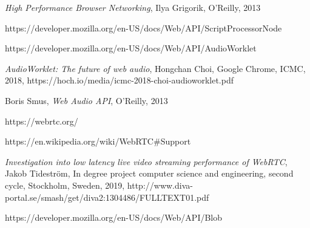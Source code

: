 \documentclass[11pt, a4paper, twoside]{article}
\begin{document}
\begin{thebibliography}{9}

  \textit{High Performance Browser Networking},
  Ilya Grigorik,
  O'Reilly,
  2013
  
  https://developer.mozilla.org/en-US/docs/Web/API/ScriptProcessorNode

  https://developer.mozilla.org/en-US/docs/Web/API/AudioWorklet

  \textit{AudioWorklet: The future of web audio},
  Hongchan Choi,
  Google Chrome,
  ICMC,
  2018,
  https://hoch.io/media/icmc-2018-choi-audioworklet.pdf

  Boris Smus,
  \textit{Web Audio API},
  O'Reilly,
  2013

  https://webrtc.org/
  
  https://en.wikipedia.org/wiki/WebRTC\#Support
  
\bibitem{}
  \textit{Investigation into low latency live video streaming performance of WebRTC},\newline
  Jakob Tidestr\"om,
  In degree project computer science and engineering, second cycle, \newline
  Stockholm,
  Sweden,
  2019,\newline
  http://www.diva-portal.se/smash/get/diva2:1304486/FULLTEXT01.pdf


  https://developer.mozilla.org/en-US/docs/Web/API/Blob
  
\end{thebibliography}
\end{document}
